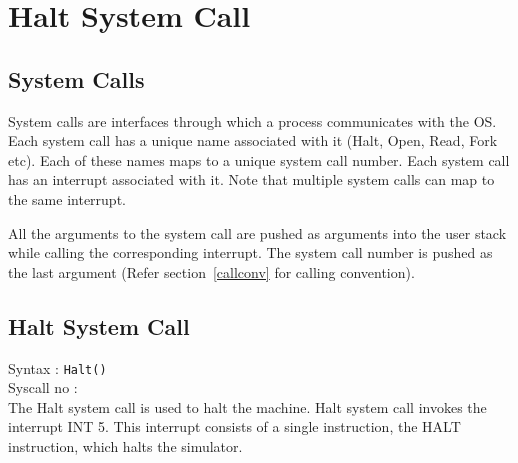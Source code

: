 \chapter{Halt System Call}
\label{chp:halt_system_calls}

\section{System Calls}
System calls are interfaces through which a process communicates with the OS. Each system call has a unique name associated with it (Halt, Open, Read, Fork etc). Each of these names maps to a unique system call number. Each system call has an interrupt associated with it. Note that multiple system calls can map to the same interrupt.

All the arguments to the system call are pushed as arguments into the user stack while calling the corresponding interrupt. The system call number is pushed as the last argument (Refer section~\ref{callconv} for calling convention).

\section{Halt System Call}
\label{haltsyscall}

Syntax : \texttt{Halt()} \\
Syscall no :  \\

The Halt system call is used to halt the machine. Halt system call invokes the interrupt INT 5. This interrupt consists of a single instruction, the HALT instruction, which halts the simulator.
